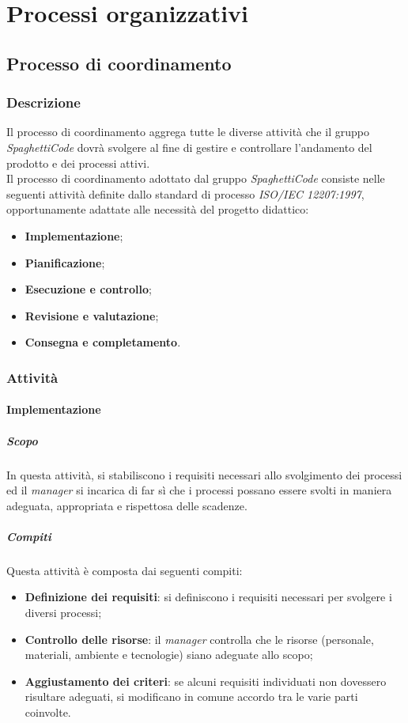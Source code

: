 \section{Processi organizzativi}
\label{sec:processi_organizativi}

\subsection{Processo di coordinamento}

\subsubsection{Descrizione}
Il processo di coordinamento aggrega tutte le diverse attività che il gruppo \emph{SpaghettiCode} dovrà svolgere al fine di gestire e controllare l'andamento del prodotto e dei processi attivi.\\

Il processo di coordinamento adottato dal gruppo \emph{SpaghettiCode} consiste nelle seguenti attività definite dallo standard di processo \emph{ISO/IEC 12207:1997}, opportunamente adattate alle necessità del progetto didattico:
\begin{itemize}
    \item \textbf{Implementazione};
    \item \textbf{Pianificazione};
    \item \textbf{Esecuzione e controllo};
    \item \textbf{Revisione e valutazione};
    \item \textbf{Consegna e completamento}.
\end{itemize}

\subsubsection{Attività}


\paragraph{Implementazione}
\label{par:Implementazione}
\subparagraph{Scopo}
\label{par:Implementazione:scopo}
In questa attività, si stabiliscono i requisiti necessari allo svolgimento dei processi ed il \emph{manager} si incarica di far sì che i processi possano essere svolti in maniera adeguata, appropriata e rispettosa delle scadenze.\\
\subparagraph{Compiti}
\label{par:Implementazione:compiti}
Questa attività è composta dai seguenti compiti:
\begin{itemize}
    \item \textbf{Definizione dei requisiti}: si definiscono i requisiti necessari per svolgere i diversi processi;
    \item \textbf{Controllo delle risorse}: il \emph{manager} controlla che le risorse (personale, materiali, ambiente e tecnologie) siano adeguate allo scopo;
    \item \textbf{Aggiustamento dei criteri}: se alcuni requisiti individuati non dovessero risultare adeguati, si modificano in comune accordo tra le varie parti coinvolte.
\end{itemize}

